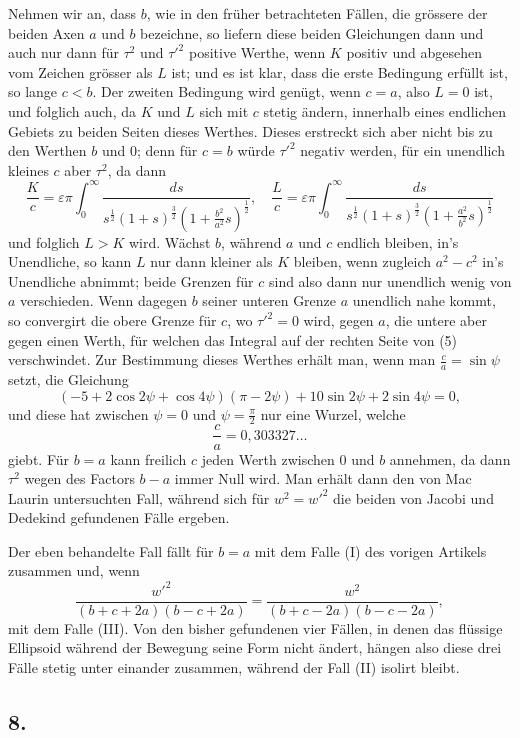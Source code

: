 \documentclass[12pt,a4paper]{book}
\theoremstyle{definition}
\theoremstyle{remark}
\begin{document}
Nehmen wir an, dass $b$, wie in den früher betrachteten Fällen, die grössere der beiden Axen $a$ und $b$ bezeichne, so liefern diese beiden Gleichungen dann und auch nur dann für $\tau^2$ und $\tau'^2$ positive Werthe, wenn $K$ positiv und abgesehen vom Zeichen grösser als $L$ ist; und es ist klar, dass die erste Bedingung erfüllt ist, so lange $c < b$. Der zweiten Bedingung wird genügt, wenn $c = a$, also $L = 0$ ist, und folglich auch, da $K$ und $L$ sich mit $c$ stetig ändern, innerhalb eines endlichen Gebiets zu beiden Seiten dieses Werthes. Dieses erstreckt sich aber nicht bis zu den Werthen $b$ und $0$; denn für $c = b$ würde $\tau'^2$ negativ werden, für ein unendlich kleines $c$ aber $\tau^2$, da dann
\[
\frac{K}{c} = \varepsilon\pi\int_0^{\infty}\!\frac{ds}{s^{\frac{1}{2}}(1+s)^{\frac{3}{2}}(1+\frac{b^2}{a^2}s)^{\frac{1}{2}}},\quad
\frac{L}{c} = \varepsilon\pi\int_0^{\infty}\!\frac{ds}{s^{\frac{1}{2}}(1+s)^{\frac{3}{2}}(1+\frac{a^2}{b^2}s)^{\frac{1}{2}}}
\]
und folglich $L > K$ wird. Wächst $b$, während $a$ und $c$ endlich bleiben, in's Unendliche, so kann $L$ nur dann kleiner als $K$ bleiben, wenn zugleich $a^2 - c^2$ in's Unendliche abnimmt; beide Grenzen für $c$ sind also dann nur unendlich wenig von $a$ verschieden. Wenn dagegen $b$ seiner unteren Grenze $a$ unendlich nahe kommt, so convergirt die obere Grenze für $c$, wo $\tau'^2 = 0$ wird, gegen $a$, die untere aber gegen einen Werth, für welchen das Integral auf der rechten Seite von (5) verschwindet. Zur Bestimmung dieses Werthes erhält man, wenn man $\frac{c}{a} = \sin\psi$ setzt, die Gleichung
\[ (-5 + 2\cos 2\psi + \cos 4\psi)(\pi - 2\psi) + 10\sin 2\psi + 2\sin 4\psi = 0, \]
und diese hat zwischen $\psi = 0$ und $\psi = \frac{\pi}{2}$ nur eine Wurzel, welche
\[ \frac{c}{a} = 0{,}303327\ldots \]
giebt. Für $b = a$ kann freilich $c$ jeden Werth zwischen $0$ und $b$ annehmen, da dann $\tau^2$ wegen des Factors $b-a$ immer Null wird. Man erhält dann den von Mac Laurin untersuchten Fall, während sich für $w^2 = w'^2$ die beiden von Jacobi und Dedekind gefundenen Fälle ergeben.

Der eben behandelte Fall fällt für $b = a$ mit dem Falle (I) des vorigen Artikels zusammen und, wenn
\[ \frac{w'^2}{(b+c+2a)(b-c+2a)} = \frac{w^2}{(b+c-2a)(b-c-2a)}, \]
mit dem Falle (III). Von den bisher gefundenen vier Fällen, in denen das flüssige Ellipsoid während der Bewegung seine Form nicht ändert, hängen also diese drei Fälle stetig unter einander zusammen, während der Fall (II) isolirt bleibt.

\subsection*{8.}
\end{document}
